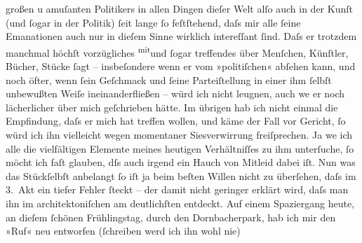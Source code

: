 \begin{ledgroupsized}[t]{13cm}
               großen u amuſanten Politikers in allen Dingen dieſer Welt alſo auch in der Kunſt (und
               ſogar in der Politik) ſeit lange ſo feſtſtehend, {\pb}daſs
               mir alle ſeine Emanationen auch nur in dieſem Sinne wirklich intereſſant ſind. Daſs
               er trotzdem manchmal höchſt vorzügliches \substVorne{}\textsuperscript{mit}\substDazwischen{}und\substHinten{}{ } ſogar treffendes über Menſchen, Künſtler,
               Bücher, Stücke ſagt – insbeſondere wenn er vom »politiſchen« abſehen kann, und noch
               öfter, wenn ſein Geſchmack und ſeine Parteiſtellung in einer ihm ſelbſt unbewußten
               Weiſe ineinanderfließen – würd ich nicht leugnen, auch we{\geminationn} er noch lächerlicher über mich geſchrie{\pb}ben hätte. Im übrigen hab ich nicht
               einmal die Empfindung, daſs er mich hat treffen wollen, und käme der Fall vor
               Gericht, ſo würd ich ihn vielleicht wegen momentaner Si{\geminationn}esverwirrung freiſprechen. Ja we{\geminationn} ich alle die
               vielfältigen Elemente meines heutigen Verhältniſſes zu ihm unterſuche, ſo möcht ich
               faſt glauben, dſs auch irgend ein Hauch von Mitleid dabei iſt.\pend
           \pstart
           Nun was das Stückſelbſt anbelangt ſo iſt ja beim beſten Willen nicht
               zu überſehen, daſs im 3. Akt ein
                  {\pb}tiefer Fehler ſteckt – der damit nicht geringer
               erklärt wird, daſs man ihn \introOben{}im\introOben{} architektoniſchen am
               deutlichſten entdeckt. Auf einem Spaziergang heute, an dieſem ſchönen Frühlingstag,
               durch den Dornbacherpark, hab ich mir den »Ruf« neu entworfen (ſchreiben werd ich ihn wohl nie)

\end{ledgroupsized}
